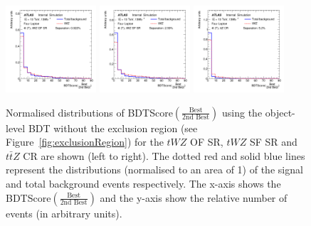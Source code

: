 \begin{figure}
    \centering
    \includegraphics[width=0.3\textwidth]{figures/bdtPlots/lep4_tWZ_4T_OF_BDT_Score_bestOver2ndBest_sep.png}
    \includegraphics[width=0.3\textwidth]{figures/bdtPlots/lep4_tWZ_4T_SF_BDT_Score_bestOver2ndBest_sep.png}
    \includegraphics[width=0.3\textwidth]{figures/bdtPlots/lep4_ttZ_4T_BDT_Score_bestOver2ndBest_sep.png}
    \caption{Normalised distributions of BDTScore$(\frac{\text{Best}}{\text{2nd Best}})$ using the object-level BDT without the exclusion region (see Figure~\ref{fig:exclusionRegion}) for the $tWZ$ OF SR, $tWZ$ SF SR and $t\bar{t}Z$ CR are shown (left to right). The dotted red and solid blue lines represent the distributions (normalised to an area of 1) of the signal and total background events respectively. The x-axis shows the BDTScore$(\frac{\text{Best}}{\text{2nd Best}})$ and the y-axis show the relative number of events (in arbitrary units).}
    \label{fig:exclusionRegion-normplots}
\end{figure}

